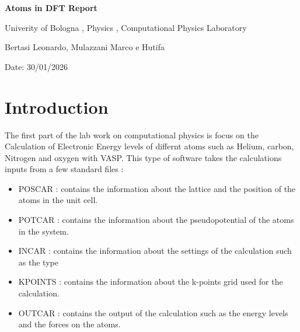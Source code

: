 \documentclass[12pt,a4paper]{article}
\begin{document}
\begin{titlepage}
    \centering
    \vspace*{2cm} %
    
    {\huge \textbf{ Atoms in DFT Report}}
    \vspace*{1,5cm} %
    
    {\large Univerity of Bologna , Physics , Computational Physics Laboratory }
    \vspace*{1cm} %

    {\large Bertasi Leonardo, Mulazzani Marco e Hutifa }
    \vspace*{1cm} %
    
     \large Date: 30/01/2026

   		


    \vfill  %
\end{titlepage}



\section{Introduction}
The first part of the lab work on computational physics is focus on the
Calculation of Electronic Energy levels of differnt atoms such as 
Helium, carbon, Nitrogen and oxygen with VASP.
This type of software takes the calculations inputs from a few standard
 files : 
 \begin{itemize}
    \item POSCAR : contains the information about the lattice 
    and the position of the atoms in the unit cell.
    \item POTCAR : contains the information about the 
    pseudopotential of the atoms in the system.
    \item INCAR : contains the information about the settings 
    of the calculation such as the type
    \item KPOINTS : contains the information about the k-points
     grid used for the calculation.
    \item OUTCAR : contains the output of the calculation such
     as the energy levels and the forces on the atoms.
 \end{itemize}
\end{document}
